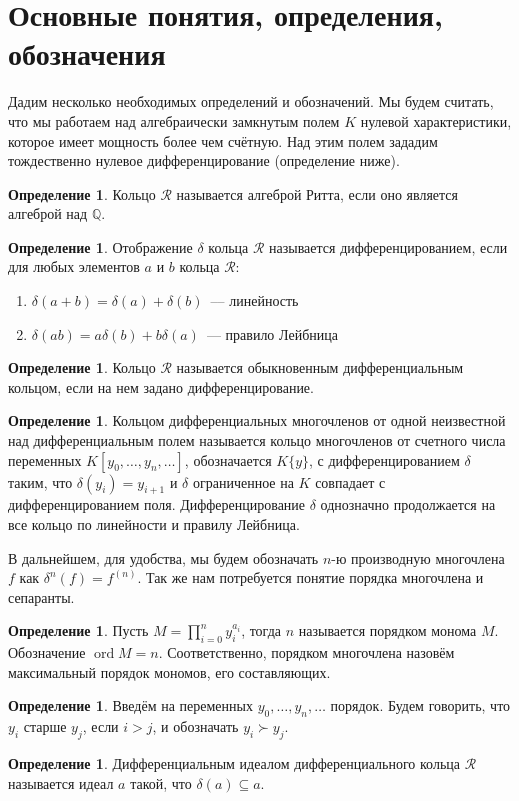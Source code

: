 \documentclass[16pt]{article}
\DeclareMathOperator{\ord}{ord}
\theoremstyle{plain}
\theoremstyle{definition}
\newtheorem{definition}[theorem]{Определение}
\theoremstyle{remark}
\begin{document}
\section{Основные понятия, определения, обозначения}
Дадим несколько необходимых определений и обозначений. Мы будем считать, что мы работаем над алгебраически замкнутым полем ${K}$ нулевой характеристики, которое имеет мощность более чем счётную. Над этим полем зададим тождественно нулевое дифференцирование (определение ниже).

\begin{definition}
Кольцо $\mathcal{R}$ называется алгеброй Ритта, если оно является алгеброй над $ \mathbb{Q} $.
\end{definition}

\begin{definition}
Отображение $\delta$ кольца $\mathcal{R}$ называется дифференцированием, если для любых элементов $a$ и $b$ кольца $\mathcal{R}$:

\begin{enumerate}
  \item $\delta(a+b)= \delta(a)+\delta(b)$~--– линейность
  \item $\delta(ab)=a\delta(b)+b\delta(a)$~--- правило Лейбница
\end{enumerate}

\end{definition}

\begin{definition}
Кольцо $\mathcal{R}$ называется обыкновенным дифференциальным кольцом, если на нем задано дифференцирование.
\end{definition}

\begin{definition}
Кольцом дифференциальных многочленов от одной неизвестной над дифференциальным полем называется кольцо многочленов от счетного числа переменных ${K}[y_0,\ldots,y_n,\ldots]$, обозначается ${K}\{y\}$, с дифференцированием $\delta$ таким, что $\delta(y_i)=y_{i+1}$ и  $\delta$ ограниченное на ${K}$ совпадает с дифференцированием поля. Дифференцирование $\delta$ однозначно продолжается на все кольцо по линейности и правилу Лейбница.
\end{definition}

В дальнейшем, для удобства, мы будем обозначать $n$-ю производную многочлена $f$ как $\delta^n(f)=f^{(n)}$. Так же нам потребуется понятие порядка многочлена и сепаранты.
\begin{definition}
Пусть $M = \prod\limits_{i=0}^ny_i^{a_i}$,  тогда $n$ называется порядком монома $M$. Обозначение $\ord M=n$. Соответственно, порядком многочлена назовём максимальный порядок
мономов, его составляющих.
\end{definition}
\begin{definition}
Введём на переменных $y_0,\ldots,y_n,\ldots$ порядок. Будем говорить, что $y_i$ старше $y_j$, если $i>j$, и обозначать $y_i\succ y_j$.
\end{definition}
\begin{definition}
Дифференциальным идеалом дифференциального кольца $\mathcal{R}$  называется идеал $a$ такой, что $\delta(a)\subseteq a$.
\end{definition}
\end{document}
